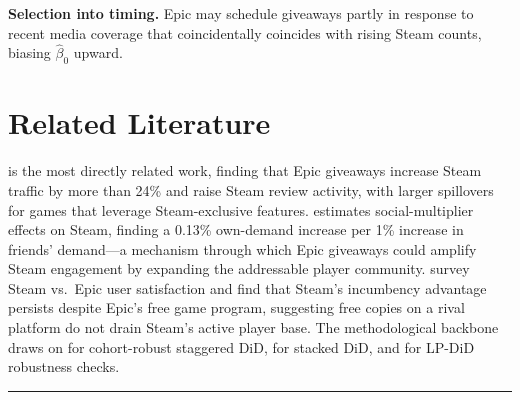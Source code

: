 \documentclass[11pt]{article}
\begin{document}
\textbf{Selection into timing.} Epic may schedule giveaways partly in response to recent media coverage that coincidentally coincides with rising Steam counts, biasing $\hat{\beta}_0$ upward.

\section{Related Literature}

\citet{clarkson2025} is the most directly related work, finding that Epic giveaways increase Steam traffic by more than 24\% and raise Steam review activity, with larger spillovers for games that leverage Steam-exclusive features. \citet{tudon2022} estimates social-multiplier effects on Steam, finding a 0.13\% own-demand increase per 1\% increase in friends' demand---a mechanism through which Epic giveaways could amplify Steam engagement by expanding the addressable player community. \citet{nabil2025} survey Steam vs.\ Epic user satisfaction and find that Steam's incumbency advantage persists despite Epic's free game program, suggesting free copies on a rival platform do not drain Steam's active player base. The methodological backbone draws on \citet{callaway2021} for cohort-robust staggered DiD, \citet{cengiz2019} for stacked DiD, and \citet{dube2023} for LP-DiD robustness checks.

\vspace{1em}
\noindent\rule{\textwidth}{0.4pt}
\vspace{0.3em}
\end{document}
